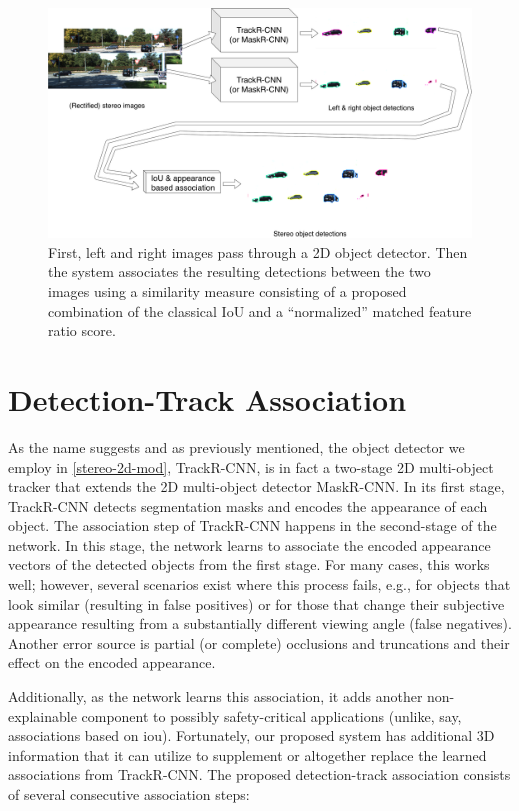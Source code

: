 \documentclass[headsepline, hidelinks, footsepline, footinclude=false, oneside, fontsize=11pt, paper=a4, listof=totoc, bibliography=totoc]{scrbook}
\begin{document}
\begin{figure}[htbp]
\centering
\includegraphics[width=.9\linewidth]{figures/flow-2d-detections.pdf}
\caption{\label{fig:flow-2d-detection}First, left and right images pass through a 2D object detector. Then the system associates the resulting detections between the two images using a similarity measure consisting of a proposed combination of the classical IoU and a ``normalized'' matched feature ratio score.}
\end{figure}

\section{Detection-Track Association \label{detection-track-assoc}}
\label{sec:orgc041b59}
   As the name suggests and as previously mentioned, the object detector we employ in \cref{stereo-2d-mod}, TrackR-CNN, is in fact a two-stage 2D multi-object tracker that extends the 2D multi-object detector MaskR-CNN.
In its first stage, TrackR-CNN detects segmentation masks and encodes the appearance of each object.
The association step of TrackR-CNN happens in the second-stage of the network. In this stage, the network learns to associate the encoded appearance vectors of the detected objects from the first stage.
For many cases, this works well; however, several scenarios exist where this process fails, e.g., for objects that look similar (resulting in false positives) or for those that change their subjective appearance resulting from a substantially different viewing angle (false negatives). 
Another error source is partial (or complete) occlusions and truncations and their effect on the encoded appearance.

Additionally, as the network learns this association, it adds another non-explainable component to possibly safety-critical applications (unlike, say, associations based on \gls{iou}). 
Fortunately, our proposed system has additional 3D information that it can utilize to supplement or altogether replace the learned associations from TrackR-CNN.
The proposed detection-track association consists of several consecutive association steps:
\end{document}
